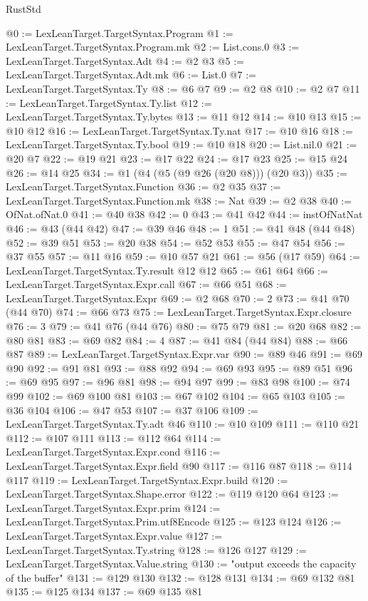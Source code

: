 \begin{lexlean}{RustStd}
\begin{coremodule}
@0 := LexLeanTarget.TargetSyntax.Program
@1 := LexLeanTarget.TargetSyntax.Program.mk
@2 := List.cons.{0}
@3 := LexLeanTarget.TargetSyntax.Adt
@4 := @2 @3
@5 := LexLeanTarget.TargetSyntax.Adt.mk
@6 := List.{0}
@7 := LexLeanTarget.TargetSyntax.Ty
@8 := @6 @7
@9 := @2 @8
@10 := @2 @7
@11 := LexLeanTarget.TargetSyntax.Ty.list
@12 := LexLeanTarget.TargetSyntax.Ty.bytes
@13 := @11 @12
@14 := @10 @13
@15 := @10 @12
@16 := LexLeanTarget.TargetSyntax.Ty.nat
@17 := @10 @16
@18 := LexLeanTarget.TargetSyntax.Ty.bool
@19 := @10 @18
@20 := List.nil.{0}
@21 := @20 @7
@22 := @19 @21
@23 := @17 @22
@24 := @17 @23
@25 := @15 @24
@26 := @14 @25
@34 := @1 (@4 (@5 (@9 @26 (@20 @8))) (@20 @3))
@35 := LexLeanTarget.TargetSyntax.Function
@36 := @2 @35
@37 := LexLeanTarget.TargetSyntax.Function.mk
@38 := Nat
@39 := @2 @38
@40 := OfNat.ofNat.{0}
@41 := @40 @38
@42 := 0
@43 := @41 @42
@44 := instOfNatNat
@46 := @43 (@44 @42)
@47 := @39 @46
@48 := 1
@51 := @41 @48 (@44 @48)
@52 := @39 @51
@53 := @20 @38
@54 := @52 @53
@55 := @47 @54
@56 := @37 @55
@57 := @11 @16
@59 := @10 @57 @21
@61 := @56 (@17 @59)
@64 := LexLeanTarget.TargetSyntax.Ty.result @12 @12
@65 := @61 @64
@66 := LexLeanTarget.TargetSyntax.Expr.call
@67 := @66 @51
@68 := LexLeanTarget.TargetSyntax.Expr
@69 := @2 @68
@70 := 2
@73 := @41 @70 (@44 @70)
@74 := @66 @73
@75 := LexLeanTarget.TargetSyntax.Expr.closure
@76 := 3
@79 := @41 @76 (@44 @76)
@80 := @75 @79
@81 := @20 @68
@82 := @80 @81
@83 := @69 @82
@84 := 4
@87 := @41 @84 (@44 @84)
@88 := @66 @87
@89 := LexLeanTarget.TargetSyntax.Expr.var
@90 := @89 @46
@91 := @69 @90
@92 := @91 @81
@93 := @88 @92
@94 := @69 @93
@95 := @89 @51
@96 := @69 @95
@97 := @96 @81
@98 := @94 @97
@99 := @83 @98
@100 := @74 @99
@102 := @69 @100 @81
@103 := @67 @102
@104 := @65 @103
@105 := @36 @104
@106 := @47 @53
@107 := @37 @106
@109 := LexLeanTarget.TargetSyntax.Ty.adt @46
@110 := @10 @109
@111 := @110 @21
@112 := @107 @111
@113 := @112 @64
@114 := LexLeanTarget.TargetSyntax.Expr.cond
@116 := LexLeanTarget.TargetSyntax.Expr.field @90
@117 := @116 @87
@118 := @114 @117
@119 := LexLeanTarget.TargetSyntax.Expr.build
@120 := LexLeanTarget.TargetSyntax.Shape.error
@122 := @119 @120 @64
@123 := LexLeanTarget.TargetSyntax.Expr.prim
@124 := LexLeanTarget.TargetSyntax.Prim.utf8Encode
@125 := @123 @124
@126 := LexLeanTarget.TargetSyntax.Expr.value
@127 := LexLeanTarget.TargetSyntax.Ty.string
@128 := @126 @127
@129 := LexLeanTarget.TargetSyntax.Value.string
@130 := "output exceeds the capacity of the buffer"
@131 := @129 @130
@132 := @128 @131
@134 := @69 @132 @81
@135 := @125 @134
@137 := @69 @135 @81

\end{coremodule}
\end{lexlean}
